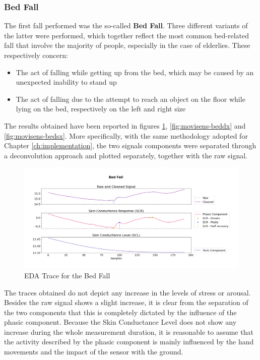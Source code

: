 \subsubsection{Bed Fall}\label{subsubsec:bed-fall}

The first fall performed was the so-called \textbf{Bed Fall}. Three different variants of the latter were performed, which together reflect the most common bed-related fall that involve the majority of people, especially in the case of elderlies. These respectively concern: 

\begin{itemize}
    \item The act of falling while getting up from the bed, which may be caused by an unexpected inability to stand up 
    \item The act of falling due to the attempt to reach an object on the floor while lying on the bed, respectively on the left and right size
\end{itemize}

The results obtained have been reported in figures \ref{fig:movisens-bed}, \ref{fig:movisens-beddx} and \ref{fig:movisens-bedsx}. More specifically, with the same methodology adopted for Chapter \ref{ch:implementation}, the two signals components were separated through a deconvolution approach and plotted separately, together with the raw signal.

\begin{figure}[h!]
    \centering
    \includegraphics[width=\textwidth]{./images/movisens/Bed.png}
    \caption{EDA Trace for the Bed Fall}
    \label{fig:movisens-bed}
\end{figure}

The traces obtained do not depict any increase in the levels of stress or arousal. Besides the raw signal shows a slight increase, it is clear from the separation of the two components that this is completely dictated by the influence of the phasic component. Because the Skin Conductance Level does not show any increase during the whole measurement duration, it is reasonable to assume that the activity described by the phasic component is mainly influenced by the hand movements and the impact of the sensor with the ground.

